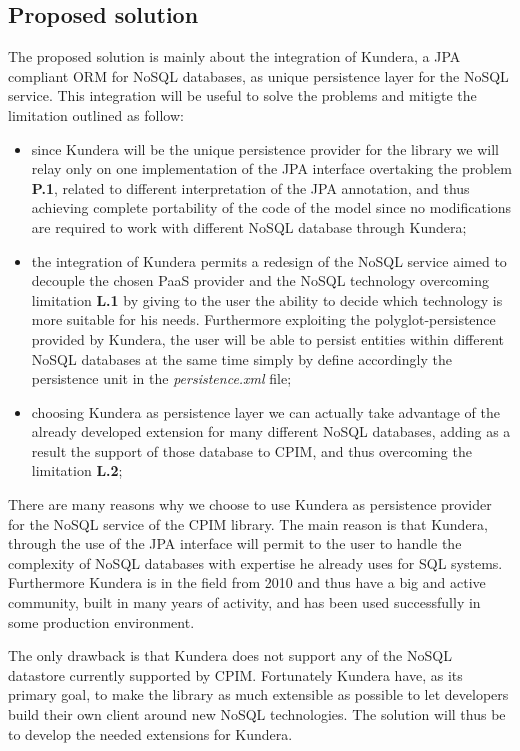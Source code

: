 \subsection{Proposed solution}
The proposed solution is mainly about the integration of Kundera, a JPA compliant ORM for NoSQL databases, as unique persistence layer for the NoSQL service. This integration will be useful to solve the problems and mitigte the limitation outlined as follow:
\begin{itemize}
\item since Kundera will be the unique persistence provider for the library we will relay only on one implementation of the JPA interface overtaking the problem \textbf{P.1}, related to different interpretation of the JPA annotation, and thus achieving complete portability of the code of the model since no modifications are required to work with different NoSQL database through Kundera;
\item the integration of Kundera permits a redesign of the NoSQL service aimed to decouple the chosen PaaS provider and the NoSQL technology overcoming limitation \textbf{L.1} by giving to the user the ability to decide which technology is more suitable for his needs. Furthermore exploiting the polyglot-persistence provided by Kundera, the user will be able to persist entities within different NoSQL databases at the same time simply by define accordingly the persistence unit in the \textit{persistence.xml} file;
\item choosing Kundera as persistence layer we can actually take advantage of the already developed extension for many different NoSQL databases, adding as a result the support of those database to CPIM, and thus overcoming the limitation \textbf{L.2};
\end{itemize}

\noindent There are many reasons why we choose to use Kundera as persistence provider for the NoSQL service of the CPIM library. The main reason is that Kundera, through the use of the JPA interface will permit to the user to handle the complexity of NoSQL databases with expertise he already uses for SQL systems. Furthermore Kundera is in the field from 2010 and thus have a big and active community, built in many years of activity, and has been used successfully in some production environment.

\noindent The only drawback is that Kundera does not support any of the NoSQL datastore currently supported by CPIM. Fortunately Kundera have, as its primary goal, to make the library as much extensible as possible to let developers build their own client around new NoSQL technologies. The solution will thus be to develop the needed extensions for Kundera.


